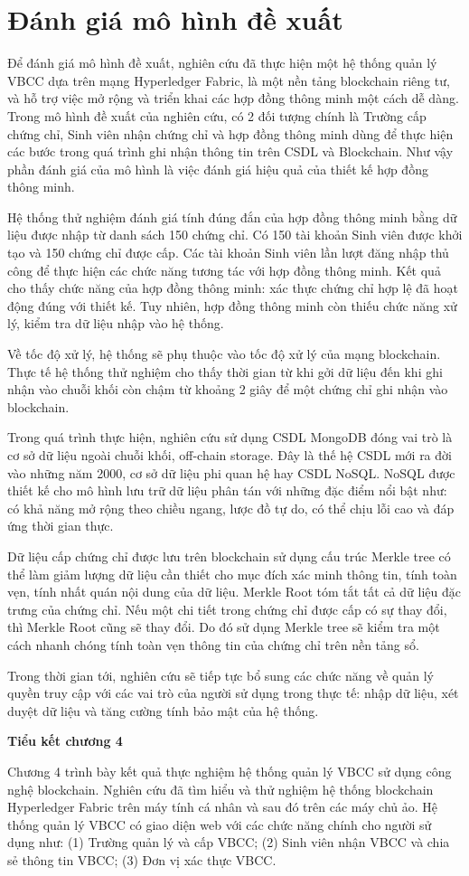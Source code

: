 \section{Đánh giá mô hình đề xuất}

Để đánh giá mô hình đề xuất, nghiên cứu đã thực hiện một hệ thống quản lý VBCC dựa trên mạng Hyperledger Fabric, là một nền tảng blockchain riêng tư, và hỗ trợ việc mở rộng và triển khai các hợp đồng thông minh một cách dễ dàng. Trong mô hình đề xuất của nghiên cứu, có 2 đối tượng chính là Trường cấp chứng chỉ, Sinh viên nhận chứng chỉ và hợp đồng thông minh dùng để thực hiện các bước trong quá trình ghi nhận thông tin trên CSDL và Blockchain. Như vậy phần đánh giá của mô hình là việc đánh giá hiệu quả của thiết kế hợp đồng thông minh.

Hệ thống thử nghiệm đánh giá tính đúng đắn của hợp đồng thông minh bằng dữ liệu được nhập từ danh sách 150 chứng chỉ. Có 150 tài khoản Sinh viên được khởi tạo và 150 chứng chỉ được cấp. Các tài khoản Sinh viên lần lượt đăng nhập thủ công để thực hiện các chức năng tương tác với hợp đồng thông minh. Kết quả cho thấy chức năng của hợp đồng thông minh: xác thực chứng chỉ hợp lệ đã hoạt động đúng với thiết kế. Tuy nhiên, hợp đồng thông minh còn thiếu chức năng xử lý, kiểm tra dữ liệu nhập vào hệ thống.

Về tốc độ xử lý, hệ thống sẽ phụ thuộc vào tốc độ xử lý của mạng blockchain. Thực tế hệ thống thử nghiệm cho thấy thời gian từ khi gởi dữ liệu đến khi ghi nhận vào chuỗi khối còn chậm từ khoảng 2 giây để một chứng chỉ ghi nhận vào blockchain.

Trong quá trình thực hiện, nghiên cứu sử dụng CSDL MongoDB đóng vai trò là cơ sở dữ liệu ngoài chuỗi khối, off-chain storage. Đây là thế hệ CSDL mới ra đời vào những năm 2000, cơ sở dữ liệu phi quan hệ hay CSDL NoSQL. NoSQL được thiết kế cho mô hình lưu trữ dữ liệu phân tán với những đặc điểm nổi bật như: có khả năng mở rộng theo chiều ngang, lược đồ tự do, có thể chịu lỗi cao và đáp ứng thời gian thực.

Dữ liệu cấp chứng chỉ được lưu trên blockchain sử dụng cấu trúc Merkle tree có thể làm giảm lượng dữ liệu cần thiết cho mục đích xác minh thông tin, tính toàn vẹn, tính nhất quán nội dung của dữ liệu. Merkle Root tóm tắt tất cả dữ liệu đặc trưng của chứng chỉ. Nếu một chi tiết trong chứng chỉ được cấp có sự thay đổi, thì Merkle Root cũng sẽ thay đổi. Do đó sử dụng Merkle tree sẽ kiểm tra một cách nhanh chóng tính toàn vẹn thông tin của chứng chỉ trên nền tảng sổ.



Trong thời gian tới, nghiên cứu sẽ tiếp tực bổ sung các chức năng về quản lý quyền truy cập  với các vai trò của người sử dụng trong thực tế: nhập dữ liệu, xét duyệt dữ liệu và tăng cường tính bảo mật của hệ thống.

\textbf{Tiểu kết chương 4}

Chương 4 trình bày kết quả thực nghiệm hệ thống quản lý VBCC sử dụng công nghệ blockchain. Nghiên cứu đã tìm hiểu và thử nghiệm hệ thống blockchain Hyperledger Fabric trên máy tính cá nhân và sau đó trên các máy chủ ảo. Hệ thống quản lý VBCC có giao diện web với các chức năng chính cho người sử dụng như: (1) Trường quản lý và cấp VBCC; (2) Sinh viên nhận VBCC và chia sẻ thông tin VBCC; (3) Đơn vị xác thực VBCC. 
